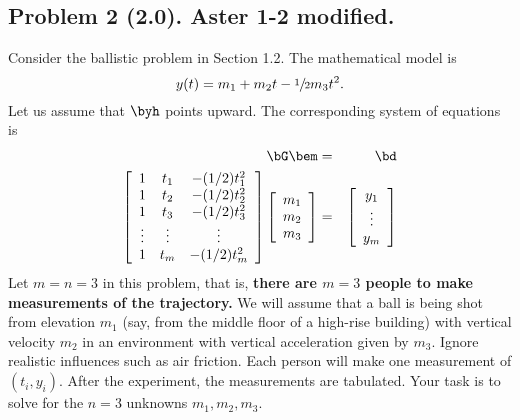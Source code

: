 \documentclass[11pt,titlepage,fleqn]{article}
\begin{document}
\subsection*{Problem 2 (2.0). Aster 1-2 modified.}

Consider the ballistic problem in Section 1.2.
The mathematical model is \citep[][Eq.~1.13]{AsterE2}
%
\begin{equation}
y(t) = m_1 + m_2 t - \sfrac{1}{2} m_3 t^2.
\label{ballistic}
\end{equation}
%
Let us assume that $\byh$ points upward.
The corresponding system of equations is
%
\begin{eqnarray}
\bG \bem &=& \bd
\label{lsq}
\\
\left[
\begin{array}{ccc}
1 & t_1 & -(1/2)t_1^2 \\
1 & t_2 & -(1/2)t_2^2 \\
1 & t_3 & -(1/2)t_3^2 \\
\vdots & \vdots & \vdots \\
1 & t_m & -(1/2)t_m^2 \\
\end{array}
\right]
\left[
\begin{array}{c}
m_1 \\ m_2 \\ m_3
\end{array}
\right]
&=& 
\left[
\begin{array}{c}
y_1 \\ \vdots \\ y_m
\end{array}
\right]
\end{eqnarray}
%
Let $m = n = 3$ in this problem, that is, {\bf there are $m=3$ people to make measurements of the trajectory.}
We will assume that a ball is being shot from elevation $m_1$ (say, from the middle floor of a high-rise building) with vertical velocity $m_2$ in an environment with vertical acceleration given by $m_3$.
Ignore realistic influences such as air friction.
Each person will make one measurement of $(t_i,y_i)$.
After the experiment, the measurements are tabulated.
Your task is to solve for the $n=3$ unknowns $m_1, m_2, m_3$.
%
\end{document}
